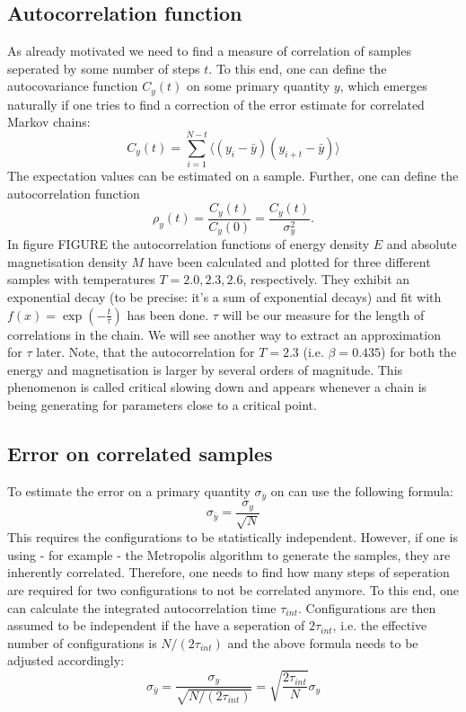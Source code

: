 \documentclass[11pt, a4paper]{scrartcl}
\begin{document}
\subsection{Autocorrelation function}
    As already motivated we need to find a measure of correlation of samples seperated by some number of steps $t$. To this end, one can define the autocovariance function $C_y(t)$ on some primary quantity $y$, which emerges naturally if one tries to find a correction of the error estimate for correlated Markov chains:
    $$C_y(t) = \sum_{i = 1}^{N-t} \langle (y_i - \bar{y})(y_{i+t} - \bar{y}) \rangle$$
    The expectation values can be estimated on a sample. Further, one can define the autocorrelation function $$
    \rho_y(t) = \frac{C_y(t)}{C_y(0)} = \frac{C_y(t)}{\sigma_y^2} .
    $$
    In figure FIGURE the autocorrelation functions of energy density $E$ and absolute magnetisation density $M$ have been calculated and plotted for three different samples with temperatures $T = 2.0, 2.3, 2.6$, respectively. They exhibit an exponential decay (to be precise: it's a sum of exponential decays) and fit with $f(x) = \exp(-\frac{t}{\tau})$ has been done. $\tau$ will be our measure for the length of correlations in the chain. We will see another way to extract an approximation for $\tau$ later. Note, that the autocorrelation for $T = 2.3$ (i.e. $\beta = 0.435$) for both the energy and magnetisation is larger by several orders of magnitude. This phenomenon is called critical slowing down and appears whenever a chain is being generating for parameters close to a critical point.

\subsection{Error on correlated samples}
    To estimate the error on a primary quantity $\sigma_{\bar{y}}$ on can use the following formula:
    $$\sigma_{\bar{y}} = \frac{\sigma_y}{\sqrt{N}}$$
    This requires the configurations to be statistically independent. However, if one is using - for example - the Metropolis algorithm to generate the samples, they are inherently correlated. Therefore, one needs to find how many steps of seperation are required for two configurations to not be correlated anymore. To this end, one can calculate the integrated autocorrelation time $\tau_{int}$. Configurations are then assumed to be independent if the have a seperation of $2 \tau_{int}$, i.e. the effective number of configurations is $N / (2 \tau_{int})$ and the above formula needs to be adjusted accordingly:
    $$\sigma_{\bar{y}} = \frac{\sigma_y}{\sqrt{N / (2 \tau_{int})}} = \sqrt{\frac{2 \tau_{int}}{N}}\sigma_y$$
\end{document}
